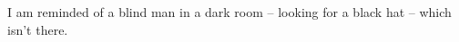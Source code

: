 \documentclass[MAIN]{subfiles}
\begin{document}
I am reminded of a blind man in a dark room -- looking for a black hat -- which isn't there.
\end{document}
